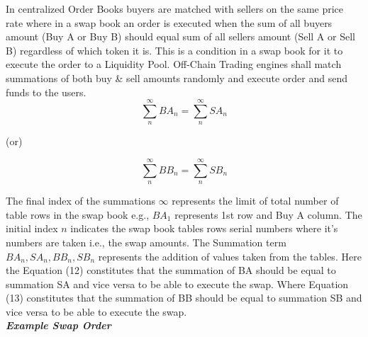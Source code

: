 \documentclass[conference]{IEEEtran}
\begin{document}
In centralized Order Books buyers are matched with sellers on the same price rate where in a swap book an order is executed when the sum of all buyers amount (Buy A or Buy B) should equal sum of all sellers amount (Sell A or Sell B) regardless of which token it is. This is a condition in a swap book for it to execute the order to a Liquidity Pool. Off-Chain Trading engines shall match summations of both buy \& sell amounts randomly and execute order and send funds to the users.\\

\[\sum_{n}^{\infty} BA_n = \sum_{n}^{\infty} SA_n\]


\begin{center}
(or)
\end{center}
\[\sum_{n}^{\infty} BB_n = \sum_{n}^{\infty} SB_n\]

The final index of the summations $\infty$ represents the limit of total number of table rows in the swap book e.g., $BA_1$ represents 1st row and Buy A column. The initial index $n$ indicates the swap book tables rows serial numbers where it's numbers are taken i.e., the swap amounts. The Summation term $BA_n, SA_n, BB_n, SB_n$ represents the addition of values taken from the tables. Here the Equation (12) constitutes that the summation of BA should be equal to summation SA and vice versa to be able to execute the swap. Where Equation (13) constitutes that the summation of BB should be equal to summation SB and vice versa to be able to execute the swap.\\
\onecolumn
\textit{\textbf{Example Swap Order}}\\
\end{document}
